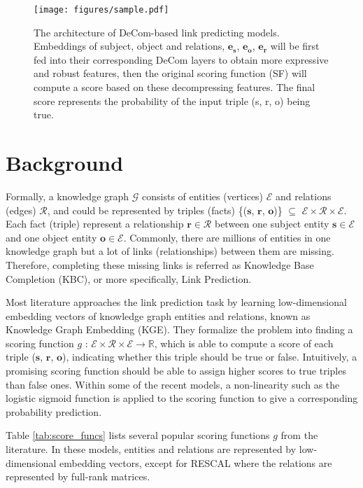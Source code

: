\documentclass[letterpaper]{article} \usepackage{aaai20}  \usepackage{times}  \usepackage{helvet} \usepackage{courier}  \usepackage{booktabs}
\begin{document}
\begin{figure}[ht]
    \centering
    \texttt{[image: figures/sample.pdf]}
    \caption{The architecture of DeCom-based link predicting models. Embeddings of subject, object and relations, $\mathbf{e_s}$, $\mathbf{e_o}$, $\mathbf{e_r}$ will be first fed into their corresponding DeCom layers to obtain more expressive and robust features, then the original scoring function (SF) will compute a score based on these decompressing features. The final score represents the probability of the input triple (s, r, o) being true.}
    \label{fig:Decom-graph}
\end{figure}

\section{Background}
Formally, a knowledge graph  $\mathcal{G}$ consists of entities (vertices) $\mathcal{E}$ and relations (edges) $\mathcal{R}$, and could be represented by triples (facts) \{($\mathbf{s}$, $\mathbf{r}$, $\mathbf{o}$)\} $\subseteq$ $\mathcal{E}\times\mathcal{R}\times\mathcal{E}$. Each fact (triple) represent a relationship  $\mathbf{r}\in\mathcal{R}$ between one subject entity $\mathbf{s}\in\mathcal{E}$ and  one object entity $\mathbf{o\in\mathcal{E}}$. Commonly, there are millions of entities in one knowledge graph but a lot of links (relationships) between them are missing. Therefore, completing these missing links is referred as Knowledge Base Completion (KBC), or more specifically, Link Prediction. 

Most literature approaches the link prediction task by learning low-dimensional embedding vectors of knowledge graph entities and relations, known as Knowledge Graph Embedding (KGE). They formalize the problem into finding a scoring function $g$ : $\mathcal{E}\times\mathcal{R}\times\mathcal{E}\rightarrow\mathbb{R}$, which is able to compute a score of each triple ($\mathbf{s}$, $\mathbf{r}$, $\mathbf{o}$), indicating whether this triple should be true or false. Intuitively, a promising scoring function should be able to assign higher scores to true triples than false ones. Within some of the recent models, a non-linearity such as the logistic sigmoid function is applied to the scoring function to give a corresponding probability prediction. 

Table \ref{tab:score_funcs} lists several popular scoring functions $g$ from the literature. In these models,  entities and relations are represented by low-dimensional embedding vectors, except for RESCAL where the relations are represented by full-rank matrices. 
\end{document}
